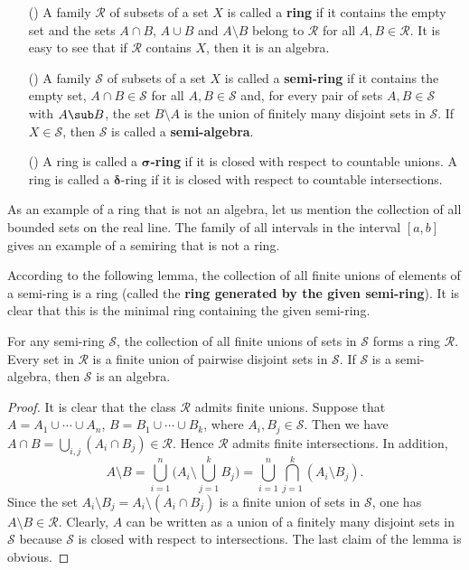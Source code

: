 \begin{definition}
\mbox{}
\begin{itemize}
\item[(\rmnum{1})] A family $\mathcal{R}$ of subsets of a set $X$ is called a \textbf{ring} if it contains the empty set and the sets $A\cap B$, $A\cup B$ and $A\setminus B$ belong to $\mathcal{R}$ for all $A,B\in\mathcal{R}$. It is easy to see that if $\mathcal{R}$ contains $X$, then it is an algebra.
\item[(\rmnum{2})] A family $\mathcal{S}$ of subsets of a set $X$ is called a \textbf{semi-ring} if it contains the empty set, $A\cap B\in\mathcal{S}$ for all $A,B\in\mathcal{S}$ and, for every pair of sets $A,B\in\mathcal{S}$ with $A\sub B$, the set $B\setminus A$ is the union of finitely many disjoint sets in $\mathcal{S}$. If $X\in\mathcal{S}$, then $\mathcal{S}$ is called a \textbf{semi-algebra}.
\item[(\rmnum{3})] A ring is called a \textbf{$\bm{\sigma}$-ring} if it is closed with respect to countable unions. A ring is called a $\bm{\delta}$-ring if it is closed with respect to countable intersections.
\end{itemize}
\end{definition}
\begin{example}
As an example of a ring that is not an algebra, let us mention the collection of all bounded sets on the real line. The family of all intervals in the interval $[a,b]$ gives an example of a semiring that is not a ring.
\end{example}
According to the following lemma, the collection of all finite unions of elements of a semi-ring is a ring (called the \textbf{ring generated by the given semi-ring}). It is clear that this is the minimal ring containing the given semi-ring.
\begin{lemma}\label{algebra generated semi-algebra}
For any semi-ring $\mathcal{S}$, the collection of all finite unions of sets in $\mathcal{S}$ forms a ring $\mathcal{R}$. Every set in $\mathcal{R}$ is a finite union of pairwise disjoint sets in $\mathcal{S}$. If $\mathcal{S}$ is a semi-algebra, then $\mathcal{S}$ is an algebra.
\end{lemma}
\begin{proof}
It is clear that the class $\mathcal{R}$ admits finite unions. Suppose that $A=A_1\cup\cdots\cup A_n$, $B=B_1\cup\cdots\cup B_k$, where $A_i,B_j\in\mathcal{S}$. Then we have $A\cap B=\bigcup_{i,j}(A_i\cap B_j)\in\mathcal{R}$. Hence $\mathcal{R}$ admits finite intersections. In addition,
\[A\setminus B=\bigcup_{i=1}^{n}\Big(A_i\setminus\bigcup_{j=1}^{k}B_j\Big)=\bigcup_{i=1}^{n}\bigcap_{j=1}^{k}(A_i\setminus B_j).\]
Since the set $A_i\setminus B_j=A_i\setminus(A_i\cap B_j)$ is a finite union of sets in $\mathcal{S}$, one has $A\setminus B\in\mathcal{R}$. Clearly, $A$ can be written as a union of a finitely many disjoint sets in $\mathcal{S}$ because $\mathcal{S}$ is closed with respect to intersections. The last claim of the lemma is obvious.
\end{proof}
